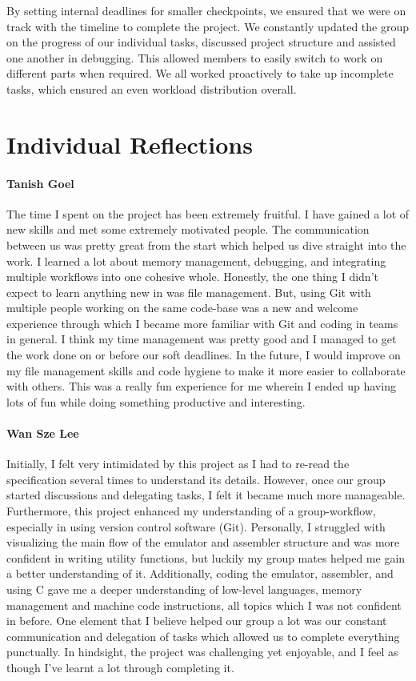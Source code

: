 \documentclass[a4paper,11pt]{article}
\begin{document}
By setting internal deadlines for smaller checkpoints, we ensured that we were on track with the timeline to complete the project. We constantly updated the group on the progress of our individual tasks, discussed project structure and assisted one another in debugging. This allowed members to easily switch to work on different parts when required. We all worked proactively to take up incomplete tasks, which ensured an even workload distribution overall. 

\section{Individual Reflections}

\paragraph{Tanish Goel} The time I spent on the project has been extremely fruitful. I have gained a lot of new skills and met some extremely motivated people. The communication between us was pretty great from the start which helped us dive straight into the work. I learned a lot about memory management, debugging, and integrating multiple workflows into one cohesive whole. Honestly, the one thing I didn't expect to learn anything new in was file management. But, using Git with multiple people working on the same code-base was a new and welcome experience through which I became more familiar with Git and coding in teams in general. I think my time management was pretty good and I managed to get the work done on or before our soft deadlines. In the future, I would improve on my file management skills and code hygiene to make it more easier to collaborate with others. This was a really fun experience for me wherein I ended up having lots of fun while doing something productive and interesting.

\paragraph{Wan Sze Lee} Initially, I felt very intimidated by this project as I had to re-read the specification several times to understand its details. However, once our group started discussions and delegating tasks, I felt it became much more manageable. Furthermore, this project enhanced my understanding of a group-workflow, especially in using version control software (Git). Personally, I struggled with visualizing the main flow of the emulator and assembler structure and was more confident in writing utility functions, but luckily my group mates helped me gain a better understanding of it. Additionally, coding the emulator, assembler, and using C gave me a deeper understanding of low-level languages, memory management and machine code instructions, all topics which I was not confident in before. One element that I believe helped our group a lot was our constant communication and delegation of tasks which allowed us to complete everything punctually. In hindsight, the project was challenging yet enjoyable, and I feel as though I've learnt a lot through completing it.
\end{document}
